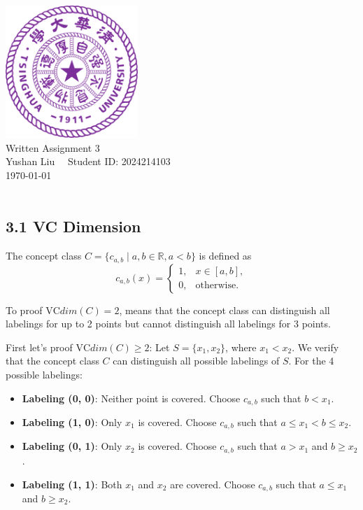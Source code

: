 \documentclass[12pt]{article}
\begin{document}
\begin{titlepage}
    \begin{center}
        \includegraphics[width=5cm]{tsinghua_logo.png}\\[4cm]  %
        {\Huge Written Assignment 3} \\[2cm]
        {\large Yushan Liu  \ \  Student ID: 2024214103}\\[6cm]
        {\normalsize \today}\\[1cm]

        \vfill
        \\
        
    \end{center}
\end{titlepage}


\subsection*{3.1 VC Dimension}

The concept class \( C = \{ c_{a,b} \mid a, b \in \mathbb{R}, a < b \} \) is defined as  
\[
c_{a,b}(x) = 
\begin{cases} 
1, & x \in [a, b], \\ 
0, & \text{otherwise}.
\end{cases}
\]  

To proof $\text{VC}dim(C)=2$, means that the concept class can distinguish all labelings 
for up to 2 points but cannot distinguish all labelings for 3 points.

First let's proof $\text{VC}dim(C)\ge 2$:
Let \( S = \{x_1, x_2\} \), where \( x_1 < x_2 \). We verify that the concept class \( C \) can distinguish all possible labelings of \( S \). For the 4 possible labelings:

\begin{itemize}
    \item \textbf{Labeling (0, 0)}: Neither point is covered. Choose \( c_{a,b} \) such that \( b < x_1 \).
    \item \textbf{Labeling (1, 0)}: Only \( x_1 \) is covered. Choose \( c_{a,b} \) such that \( a \leq x_1 < b \leq x_2 \).
    \item \textbf{Labeling (0, 1)}: Only \( x_2 \) is covered. Choose \( c_{a,b} \) such that \( a > x_1 \) and \( b \geq x_2 \).
    \item \textbf{Labeling (1, 1)}: Both \( x_1 \) and \( x_2 \) are covered. Choose \( c_{a,b} \) such that \( a \leq x_1 \) and \( b \geq x_2 \).
\end{itemize}
\end{document}
